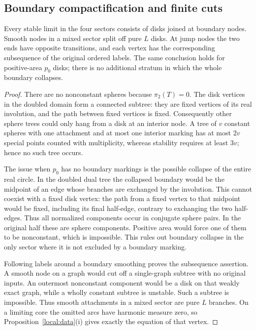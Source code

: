 \subsection{Boundary compactification and finite cuts}

\begin{lemma}\label{local:disk-trees}
Every stable limit in the four sectors consists of disks joined at
boundary nodes.  Smooth nodes in a mixed sector split off pure $L$
disks.  At jump nodes the two ends have opposite transitions, and each
vertex has the corresponding subsequence of the original ordered
labels.  The same conclusion holds for positive-area $p_0$ disks;
there is no additional stratum in which the whole boundary collapses.
\end{lemma}
\begin{proof}
There are no nonconstant spheres because $\pi_2(T)=0$.  The disk vertices
in the doubled domain form a connected subtree: they are fixed vertices
of its real involution, and the path between fixed vertices is fixed.
Consequently other sphere trees could only hang from a disk at an
interior node.  A tree of $v$ constant spheres with one attachment and
at most one interior marking has at most $2v$ special points counted
with multiplicity, whereas stability requires at least $3v$; hence no
such tree occurs.

The issue when $p_0$ has no boundary markings is the possible collapse
of the entire real circle.  In the doubled dual tree the collapsed
boundary would be the midpoint of an edge whose branches are exchanged
by the involution.  This cannot coexist with a fixed disk vertex:
the path from a fixed vertex to that midpoint would be fixed, including
its final half-edge, contrary to exchanging the two half-edges.  Thus
all normalized components occur in conjugate sphere pairs.  In the
original half these are sphere components.  Positive area would force
one of them to be nonconstant, which is impossible.  This rules out
boundary collapse in the only sector where it is not excluded by a
boundary marking.

Following labels around a boundary smoothing proves the subsequence
assertion.  A smooth node on a graph would cut off a single-graph
subtree with no original inputs.  An outermost nonconstant component
would be a disk on that weakly exact graph, while a wholly constant
subtree is unstable.  Such a subtree is impossible.  Thus smooth
attachments in a mixed sector are pure $L$ branches.  On a limiting
core the omitted arcs have harmonic measure zero, so
Proposition~\ref{local:data}(i) gives exactly the equation of that vertex.
\end{proof}

